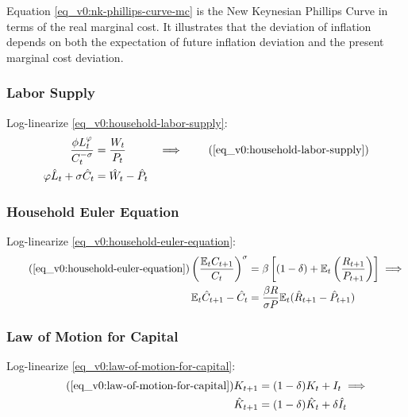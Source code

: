 \documentclass[
thesis.tex
]{subfiles}
\begin{document}
	Equation \ref{eq_v0:nk-phillips-curve-mc} is the New Keynesian Phillips Curve in terms of the real marginal cost. It illustrates that the deviation of inflation depends on both the expectation of future inflation deviation and the present marginal cost deviation.
	
	
	\subsubsection*{Labor Supply}
	
	Log-linearize \ref{eq_v0:household-labor-supply}:
	\begin{alignat}{2}
		\frac{\phi L_t^{\varphi}}{C_t^{-\sigma}} &= \frac{W_t}{P_t} & \implies \tag{\ref{eq_v0:household-labor-supply}} \\
		\varphi \hat{L}_t + \sigma \hat{C}_t &= \hat{W}_t - \hat{P}_t & \label{eq_v0:ll-labor-supply}
	\end{alignat}
	
	
	\subsubsection*{Household Euler Equation}
	
	Log-linearize \ref{eq_v0:household-euler-equation}:
	\begin{align}
		\tag{\ref{eq_v0:household-euler-equation}}
		\left( \frac{\mathbb{E}_t C_{t+1}}{C_t} \right)^\sigma &= \beta \left[ (1-\delta) + \mathbb{E}_t \left(\frac{R_{t+1}}{P_{t+1}}\right) \right] \implies \\
		\label{eq_v0:ll-household-euler-equation}
		\E \hat{C}_{t+1} - \hat{C}_t &= \frac{\beta R}{\sigma P} \E(\hat{R}_{t+1} - \hat{P}_{t+1})
	\end{align}
	
	
	\subsubsection*{Law of Motion for Capital}
	
	Log-linearize \ref{eq_v0:law-of-motion-for-capital}:
	\begin{align}
		\tag{\ref{eq_v0:law-of-motion-for-capital}}
		K_{t+1} &= (1-\delta)K_t + I_t \implies \\
		\label{eq_v0:ll-law-of-motion-for-capital}
		\hat{K}_{t+1} &= (1-\delta)\hat{K}_t + \delta \hat{I}_t
	\end{align}
	
\end{document}
